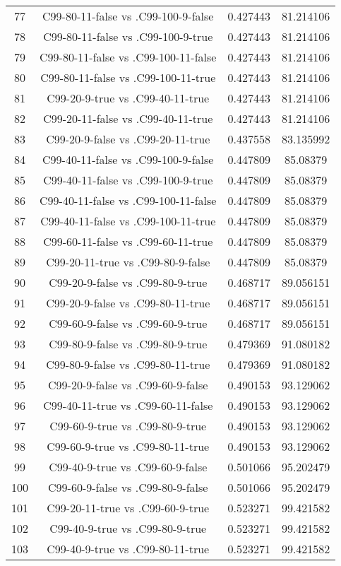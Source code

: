 \documentclass[a4paper,10pt]{article}
\begin{document}
\begin{landscape}
\begin{table}[!htp]
\begin{tabular}{cccc}
77&C99-80-11-false vs .C99-100-9-false&0.427443&81.214106\\
78&C99-80-11-false vs .C99-100-9-true&0.427443&81.214106\\
79&C99-80-11-false vs .C99-100-11-false&0.427443&81.214106\\
80&C99-80-11-false vs .C99-100-11-true&0.427443&81.214106\\
81&C99-20-9-true vs .C99-40-11-true&0.427443&81.214106\\
82&C99-20-11-false vs .C99-40-11-true&0.427443&81.214106\\
83&C99-20-9-false vs .C99-20-11-true&0.437558&83.135992\\
84&C99-40-11-false vs .C99-100-9-false&0.447809&85.08379\\
85&C99-40-11-false vs .C99-100-9-true&0.447809&85.08379\\
86&C99-40-11-false vs .C99-100-11-false&0.447809&85.08379\\
87&C99-40-11-false vs .C99-100-11-true&0.447809&85.08379\\
88&C99-60-11-false vs .C99-60-11-true&0.447809&85.08379\\
89&C99-20-11-true vs .C99-80-9-false&0.447809&85.08379\\
90&C99-20-9-false vs .C99-80-9-true&0.468717&89.056151\\
91&C99-20-9-false vs .C99-80-11-true&0.468717&89.056151\\
92&C99-60-9-false vs .C99-60-9-true&0.468717&89.056151\\
93&C99-80-9-false vs .C99-80-9-true&0.479369&91.080182\\
94&C99-80-9-false vs .C99-80-11-true&0.479369&91.080182\\
95&C99-20-9-false vs .C99-60-9-false&0.490153&93.129062\\
96&C99-40-11-true vs .C99-60-11-false&0.490153&93.129062\\
97&C99-60-9-true vs .C99-80-9-true&0.490153&93.129062\\
98&C99-60-9-true vs .C99-80-11-true&0.490153&93.129062\\
99&C99-40-9-true vs .C99-60-9-false&0.501066&95.202479\\
100&C99-60-9-false vs .C99-80-9-false&0.501066&95.202479\\
101&C99-20-11-true vs .C99-60-9-true&0.523271&99.421582\\
102&C99-40-9-true vs .C99-80-9-true&0.523271&99.421582\\
103&C99-40-9-true vs .C99-80-11-true&0.523271&99.421582\\

\end{tabular}
\end{table}
\end{landscape}
\end{document}
